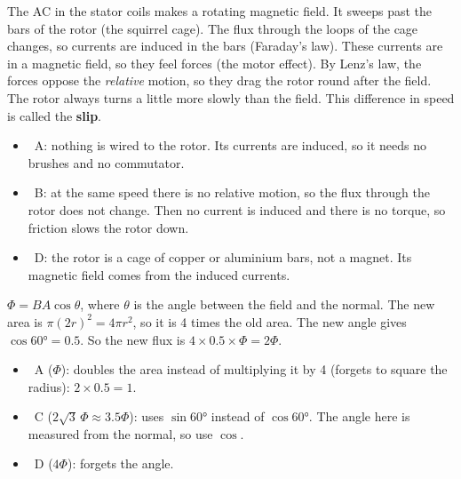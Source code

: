 \begin{practiceanswers}
\begin{practiceans}
  The AC in the stator coils makes a rotating magnetic field. It sweeps past the bars of
  the rotor (the squirrel cage). The flux through the loops of the cage changes, so currents
  are induced in the bars (Faraday's law). These currents are in a magnetic field, so they
  feel forces (the motor effect). By Lenz's law, the forces oppose the \emph{relative}
  motion, so they drag the rotor round after the field. The rotor always turns a little
  more slowly than the field. This difference in speed is called the \textbf{slip}.
  \begin{itemize}
    \item \xmark\ A: nothing is wired to the rotor. Its currents are induced, so it needs no
          brushes and no commutator.
    \item \xmark\ B: at the same speed there is no relative motion, so the flux through the
          rotor does not change. Then no current is induced and there is no torque, so
          friction slows the rotor down.
    \item \xmark\ D: the rotor is a cage of copper or aluminium bars, not a magnet. Its
          magnetic field comes from the induced currents.
  \end{itemize}
\end{practiceans}

\begin{practiceans}
  $\Phi = BA\cos\theta$, where $\theta$ is the angle between the field and the normal.
  The new area is $\pi(2r)^2 = 4\pi r^2$, so it is 4 times the old area. The new angle gives
  $\cos\ang{60} = 0.5$. So the new flux is $4 \times 0.5 \times \Phi = 2\Phi$.
  \begin{itemize}
    \item \xmark\ A ($\Phi$): doubles the area instead of multiplying it by 4 (forgets to
          square the radius): $2 \times 0.5 = 1$.
    \item \xmark\ C ($2\sqrt{3}\,\Phi \approx 3.5\Phi$): uses $\sin\ang{60}$ instead of
          $\cos\ang{60}$. The angle here is measured from the normal, so use $\cos$.
    \item \xmark\ D ($4\Phi$): forgets the angle.
  \end{itemize}
\end{practiceans}


\end{practiceanswers}
